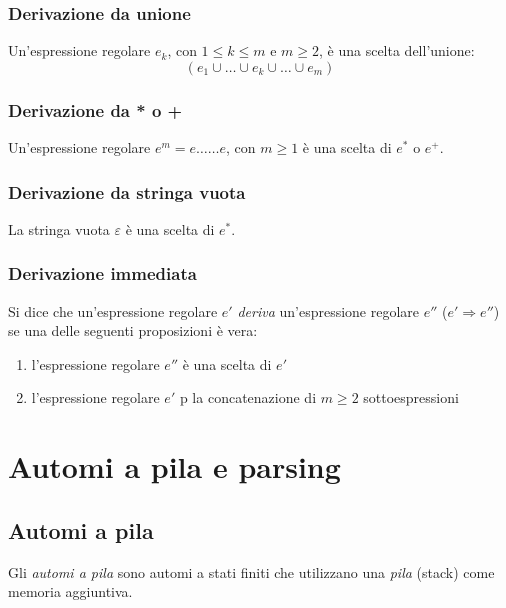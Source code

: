 \documentclass[11pt]{article}
\begin{document}
\subsubsection*{Derivazione da unione}
Un'espressione regolare $e_k$, con $1\leq k\leq m$ e $m\geq2$, è una scelta dell'unione:
\begin{equation*}
    (e_1\cup \dots\cup e_k\cup \dots\cup e_m)
\end{equation*}
\subsubsection*{Derivazione da * o +}
Un'espressione regolare $e^m=e\dots \dots e$, con $m\geq 1$ è una scelta di $e^*$ o $e^+$.
\subsubsection*{Derivazione da stringa vuota}
La stringa vuota $\varepsilon$ è una scelta di $e^*$.
\subsubsection*{Derivazione immediata}
Si dice che un'espressione regolare $e'$ \textit{deriva} un'espressione regolare $e''$ ($e'\Rightarrow e''$) se una delle 
seguenti proposizioni è vera:
\begin{enumerate}
    \item l'espressione regolare $e''$ è una scelta di $e'$
    \item l'espressione regolare $e'$ p la concatenazione di $m\geq 2$ sottoespressioni
\end{enumerate}

\section{Automi a pila e parsing}
\subsection{Automi a pila}
Gli \textit{automi a pila} sono automi a stati finiti che utilizzano una \textit{pila} (stack) come memoria aggiuntiva.
\end{document}
